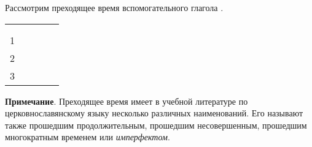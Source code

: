 \documentclass[11pt,a4paper,oneside]{memoir}
\newcommand{\spheading}[2][10em]{%
    \rotatebox{90}{\parbox{#1}{\raggedright #2}}}
\begin{document}
    Рассмотрим преходящее время вспомогательного глагола {}.


    \begin{center}
        \renewcommand*{\arraystretch}{1.2}
        \begin{tabular}[c]{|c|c|c|c|c|}
            \hline

            \multirow{2}{*}{\spheading[2em]{\scriptsize{Лицо}}}
            & 
            & 
            & 
            \\
            
            
            &
            & \scriptsize{}
            & \scriptsize{}
            &
            \\
            
            \hline
            
            1
            & 
            & 
            & 
            & 
            \\\hline
            
            2
            & 
            & 
            & 
            & 
            \\\hline
            
            3
            & 
            & 
            & 
            & 
            \\\hline
            
        \end{tabular}
    \end{center}

    \textbf{Примечание}. Преходящее время имеет в учебной литературе по церковнославянскому языку несколько различных наименований. Его называют также прошедшим продолжительным, прошедшим несовершенным, прошедшим многократным временем или \emph{имперфектом}.
\end{document}
